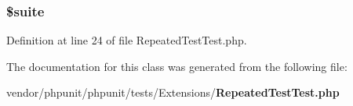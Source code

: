 \subsubsection[{\$suite}]{\setlength{\rightskip}{0pt plus 5cm}\$suite\hspace{0.3cm}{\ttfamily [protected]}}\label{class_extensions___repeated_test_test_a902f79118bd76caa816154e42fe7af8b}


Definition at line 24 of file Repeated\+Test\+Test.\+php.



The documentation for this class was generated from the following file\+:\begin{DoxyCompactItemize}
\item 
vendor/phpunit/phpunit/tests/\+Extensions/{\bf Repeated\+Test\+Test.\+php}\end{DoxyCompactItemize}
